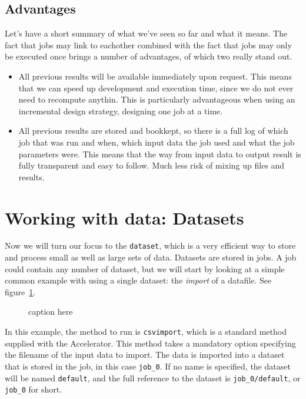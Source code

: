 \documentclass[a4paper]{article}
\begin{document}
\clearpage






\subsection{Advantages}
Let's have a short summary of what we've seen so far and what it
means.  The fact that jobs may link to eachother combined with the
fact that jobs may only be executed once brings a number of
advantages, of which two really stand out.
\begin{itemize}
\item[1.] All previous results will be available immediately upon
  request.  This means that we can speed up development and execution
  time, since we do not ever need to recompute anythin.  This is
  particularly advantageous when using an incremental design strategy,
  designing one job at a time.
\item[2.] All previous results are stored and bookkept, so there is a
  full log of which job that was run and when, which input data the
  job used and what the job parameters were.  This means that the way
  from input data to output result is fully transparent and easy to
  follow.  Much less risk of mixing up files and results.
\end{itemize}

\clearpage





\section{Working with data: Datasets}
Now we will turn our focus to the \texttt{dataset}, which is a very
efficient way to store and process small as well as large sets of
data.  Datasets are stored in jobs.  A job could contain any number of
dataset, but we will start by looking at a simple common example with
using a single dataset: the \textsl{import} of a datafile.  See
figure~\ref{fig:dataset_csvimport}.

\begin{figure}[h!]
  \begin{center}
    
    \caption{caption here}
    \label{fig:dataset_csvimport}
  \end{center}
\end{figure}

\noindent In this example, the method to run is \texttt{csvimport},
which is a standard method supplied with the Accelerator.  This method
takes a mandatory option specifying the filename of the input data to
import.  The data is imported into a dataset that is stored in the
job, in this case \texttt{job\_0}.  If no name is specified, the
dataset will be named \texttt{default}, and the full reference to the
dataset is \texttt{job\_0/default}, or \texttt{job\_0} for short.
\end{document}
